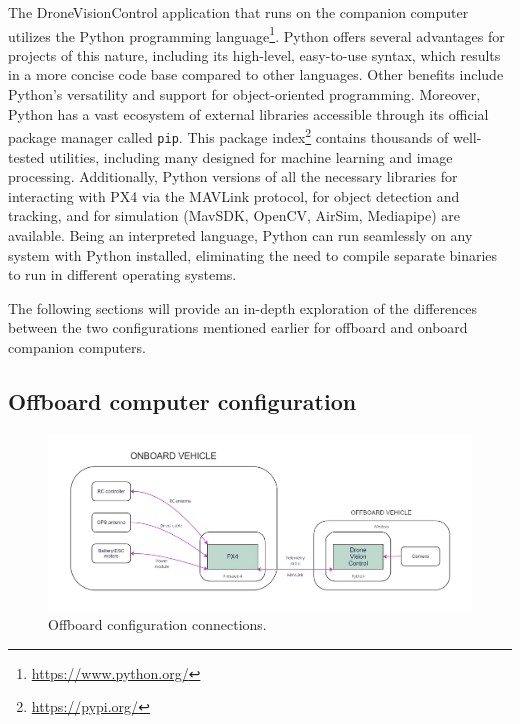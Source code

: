 The DroneVisionControl application that runs on the companion computer utilizes the Python programming language\footnote{\url{https://www.python.org/}}. Python offers several advantages for projects of this nature, including its high-level, easy-to-use syntax, which results in a more concise code base compared to other languages. Other benefits include Python's versatility and support for object-oriented programming. Moreover, Python has a vast ecosystem of external libraries accessible through its official package manager called \texttt{pip}. This package index\footnote{\url{https://pypi.org/}} contains thousands of well-tested utilities, including many designed for machine learning and image processing. Additionally, Python versions of all the necessary libraries for interacting with PX4 via the MAVLink protocol, for object detection and tracking, and for simulation (MavSDK, OpenCV, AirSim, Mediapipe) are available. Being an interpreted language, Python can run seamlessly on any system with Python installed, eliminating the need to compile separate binaries to run in different operating systems.

The following sections will provide an in-depth exploration of the differences between the two configurations mentioned earlier for offboard and onboard companion computers.

\subsection{Offboard computer configuration}
\label{subsec:offboard}

\begin{figure}
  \centering
  \includegraphics[width=\textwidth,keepaspectratio]{img/offboard-diagram.jpg}
  \caption{Offboard configuration connections.}
  \label{fig:offboard-config}
\end{figure}

